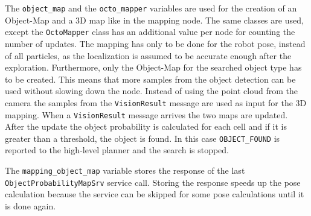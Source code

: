 The \texttt{object{\_}map} and the \texttt{octo{\_}mapper} variables are used for the creation of an Object-Map and a 3D map like in the mapping node. The same classes are used, except the \texttt{OctoMapper} class has an additional value per node for counting the number of updates. The mapping has only to be done for the robot pose, instead of all particles, as the localization is assumed to be accurate enough after the exploration. Furthermore, only the Object-Map for the searched object type has to be created. This means that more samples from the object detection can be used without slowing down the node. Instead of using the point cloud from the camera the samples from the \texttt{VisionResult} message are used as input for the 3D mapping. When a \texttt{VisionResult} message arrives the two maps are updated. After the update the object probability is calculated for each cell and if it is greater than a threshold, the object is found. In this case \texttt{OBJECT{\_}FOUND} is reported to the high-level planner and the search is stopped.

The \texttt{mapping{\_}object{\_}map} variable stores the response of the last \linebreak \texttt{ObjectProbabilityMapSrv} service call. Storing the response speeds up the pose calculation because the service can be skipped for some pose calculations until it is done again. 

